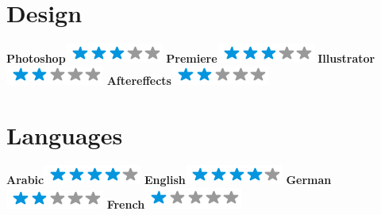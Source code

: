 \documentclass[]{friggeri-cv}
\begin{document}
\begin{aside}
  \section{Design}
    \textbf{Photoshop}\includegraphics[scale=0.40]{img/3stars.png}
    \textbf{Premiere}\includegraphics[scale=0.40]{img/3stars.png}
    \textbf{Illustrator}\includegraphics[scale=0.40]{img/2stars.png}
    \textbf{Aftereffects}\includegraphics[scale=0.40]{img/2stars.png}
    ~
  \section{Languages}
    \textbf{Arabic}\includegraphics[scale=0.40]{img/4stars.png}
    \textbf{English}\includegraphics[scale=0.40]{img/4stars.png}
    \textbf{German}\includegraphics[scale=0.40]{img/2stars.png}
    \textbf{French}\includegraphics[scale=0.40]{img/1stars.png}
    ~
\end{aside}
\end{document}

